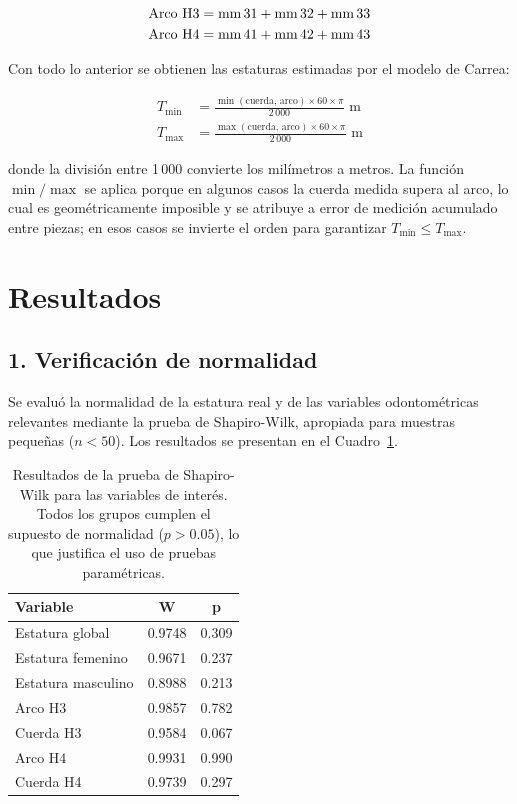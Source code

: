 \documentclass[11pt,letterpaper]{article}
\begin{document}
\begin{align}
    \text{Arco H3} &= \text{mm\,31} + \text{mm\,32} + \text{mm\,33} \\
    \text{Arco H4} &= \text{mm\,41} + \text{mm\,42} + \text{mm\,43}
\end{align}

Con todo lo anterior se obtienen las estaturas estimadas por el modelo de Carrea:

\begin{align}
    T_{\min} &= \frac{\min(\text{cuerda, arco}) \times 60 \times \pi}{2\,000} \text{ m} \\[4pt]
    T_{\max} &= \frac{\max(\text{cuerda, arco}) \times 60 \times \pi}{2\,000} \text{ m}
\end{align}

donde la división entre 1\,000 convierte los milímetros a metros. La función $\min/\max$ se aplica porque en algunos casos la cuerda medida supera al arco, lo cual es geométricamente imposible y se atribuye a error de medición acumulado entre piezas; en esos casos se invierte el orden para garantizar $T_{\min} \leq T_{\max}$.


\section*{Resultados}

\subsection*{1. Verificación de normalidad}

Se evaluó la normalidad de la estatura real y de las variables odontométricas relevantes mediante la prueba de Shapiro-Wilk, apropiada para muestras pequeñas ($n < 50$). Los resultados se presentan en el Cuadro~\ref{tab:shapiro}.

\begin{table}[h!]
\centering
\begin{tabular}{lcc}
\toprule
\textbf{Variable} & \textbf{W} & \textbf{p} \\
\midrule
Estatura global    & 0.9748 & 0.309 \\
Estatura femenino  & 0.9671 & 0.237 \\
Estatura masculino & 0.8988 & 0.213 \\
Arco H3            & 0.9857 & 0.782 \\
Cuerda H3          & 0.9584 & 0.067 \\
Arco H4            & 0.9931 & 0.990 \\
Cuerda H4          & 0.9739 & 0.297 \\
\bottomrule
\end{tabular}
\caption{Resultados de la prueba de Shapiro-Wilk para las variables de interés. Todos los grupos cumplen el supuesto de normalidad ($p > 0.05$), lo que justifica el uso de pruebas paramétricas.}
\label{tab:shapiro}
\end{table}
\end{document}
